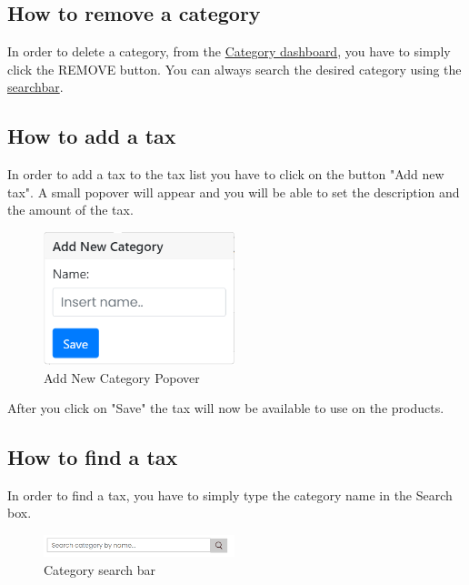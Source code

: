 \subsection{How to remove a category}\label{_removeCategory}
In order to delete a category, from the \hyperref[_categorymanagement]{Category dashboard}, you have to simply click the REMOVE button.
You can always search the desired category using the \hyperref[_findCategory]{searchbar}.

\subsection{How to add a tax}\label{_addTax}
In order to add a tax to the tax list you have to click on the button "Add new tax". A small popover will appear and you will be able to set the description and the amount of the tax.
\begin{figure}[H]
    \centering
    \includegraphics[width=15em]{res/images/venditore/addcategorypopover.png}
    \caption{Add New Category Popover}
\end{figure}
After you click on "Save" the tax will now be available to use on the products.

\subsection{How to find a tax}\label{_findTax}
In order to find a tax, you have to simply type the category name in the Search box.
\begin{figure}[H]
    \centering
    \includegraphics[width=15em]{res/images/venditore/categorysearchbar.png}
    \caption{Category search bar}
\end{figure}

